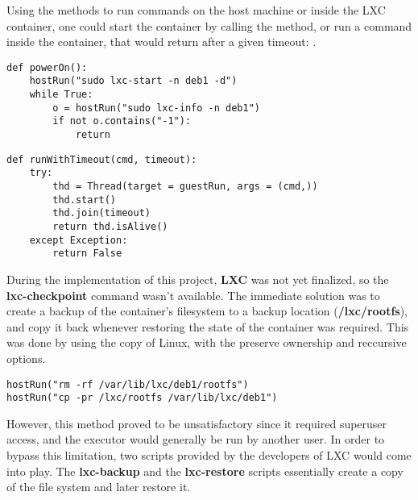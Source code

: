 Using the methods to run commands on the host machine or inside the 
LXC container, one could start the container by calling the 
 method, or run a command inside the container,
that would return after a given timeout: .

\lstset{caption=Method Called to Power on the Container,language=python,label=lst:lxc-poweron}
\begin{lstlisting}
def powerOn():
    hostRun("sudo lxc-start -n deb1 -d")
    while True:
        o = hostRun("sudo lxc-info -n deb1")
        if not o.contains("-1"):
            return
\end{lstlisting}


\lstset{caption=Method That Runs a Command Inside the Container,language=python,label=lst:lxc-runtimeout}
\begin{lstlisting}
def runWithTimeout(cmd, timeout):
    try:
        thd = Thread(target = guestRun, args = (cmd,))
        thd.start()
        thd.join(timeout)
        return thd.isAlive()
    except Exception:
        return False
\end{lstlisting}


During the implementation of this project, \textbf{LXC} was not yet finalized,
so the \textbf{lxc-checkpoint} command wasn't available. 
The immediate solution was to create a backup of the container's filesystem to a 
backup location (\textbf{/lxc/rootfs}), and copy it back whenever 
restoring the state of the container was required. This was done by using the
copy  of Linux, with the preserve ownership and
reccursive options.

\lstset{caption=Restoring the Contaier to a Previous State, language=python, label=lst:lxc-restore}
\begin{lstlisting}
hostRun("rm -rf /var/lib/lxc/deb1/rootfs")
hostRun("cp -pr /lxc/rootfs /var/lib/lxc/deb1")
\end{lstlisting}

However, this method proved to be unsatisfactory since it required superuser access, and
the executor would generally be run by another user. In order to bypass this limitation,
two scripts provided by the developers of LXC would come into play. 
The \textbf{lxc-backup} and the \textbf{lxc-restore} scripts essentially create a
copy of the file system and later restore it.

